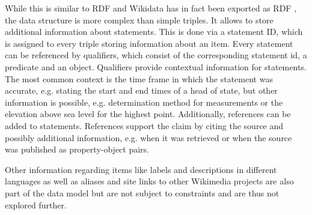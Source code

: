 \documentclass[hyperref,bachelorofscience,fleqn]{cgvpub}
\begin{document}
While this is similar to RDF and Wikidata has in fact been exported as RDF \cite{EGKMV2014}, the data structure is more complex than simple triples. It allows to store additional information about statements. This is done via a statement ID, which is assigned to every triple storing information about an item. Every statement can be referenced by qualifiers, which consist of the corresponding statement id, a predicate and an object. Qualifiers provide contextual information for statements. The most common context is the time frame in which the statement was accurate, e.g. stating the start and end times of a head of state, but other information is possible, e.g. determination method for measurements or the elevation above sea level for the highest point. Additionally, references can be added to statements. References support the claim by citing the source and possibly additional information, e.g. when it was retrieved or when the source was published as property-object pairs.

Other information regarding items like labels and descriptions in different languages as well as aliases and site links to other Wikimedia projects are also part of the data model but are not subject to constraints and are thus not explored further.
\end{document}
